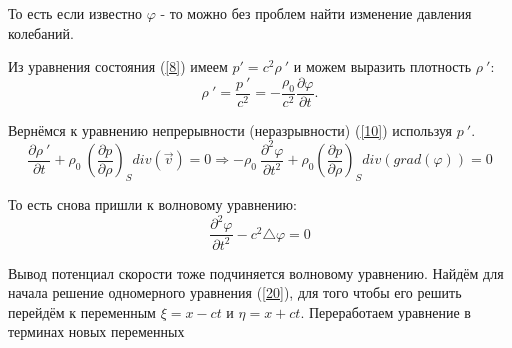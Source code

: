 \documentclass[14pt,a4paper,oneside]{extarticle}	%
\begin{document}
То есть если известно $ \varphi $ - то можно без проблем найти изменение давления колебаний.

Из уравнения состояния (\ref{8}) имеем $ p' = c^{2}  \rho\:' $  и можем выразить плотность $ \rho\:' $:
\begin{equation}\label{18}
\rho\:' = \frac{p\:'}{c^{2}} = - \frac{\rho_{0}}{c^{2}}\frac{\partial \varphi}{\partial t}.
\end{equation}

Вернёмся к уравнению непрерывности (неразрывности) (\ref{10}) используя $ p\:' $.
\begin{equation*}
\frac{\partial \rho\:'}{\partial t} + \rho_{0}\:\left( \frac{\partial p}{\partial \rho} \right)_{S} div(\vec{v}) = 0 \Rightarrow - \rho_{0}\:\frac{\partial^{2} \varphi}{\partial t^{2}} + \rho_{0}\left( \frac{\partial p}{\partial \rho} \right)_{S} div(grad(\varphi)) = 0
\end{equation*}

То есть снова пришли к волновому уравнению:
\begin{equation}\label{20}
\frac{\partial^{2} \varphi}{\partial t^{2}} - c^{2} \triangle \varphi = 0
\end{equation}

Вывод потенциал скорости тоже подчиняется волновому уравнению.
Найдём для начала решение одномерного уравнения (\ref{20}), для того чтобы его решить перейдём к переменным $ \xi = x - ct $ и $ \eta = x + ct $. Переработаем уравнение в терминах новых переменных 
\end{document}
